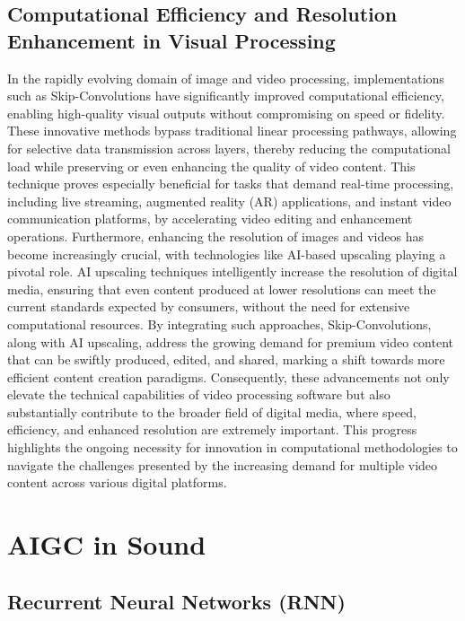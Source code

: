 \documentclass[11pt,a4paper,oneside]{report}
\begin{document}
\subsection{Computational Efficiency and Resolution Enhancement in Visual Processing}

In the rapidly evolving domain of image and video processing, implementations such as Skip-Convolutions \cite{habibian2021skip} have significantly improved computational efficiency, enabling high-quality visual outputs without compromising on speed or fidelity. 
These innovative methods bypass traditional linear processing pathways, allowing for selective data transmission across layers, thereby reducing the computational load while preserving or even enhancing the quality of video content. 
This technique proves especially beneficial for tasks that demand real-time processing, including live streaming, augmented reality (AR) applications, and instant video communication platforms, by accelerating video editing and enhancement operations. 
Furthermore, enhancing the resolution of images and videos has become increasingly crucial, with technologies like AI-based upscaling playing a pivotal role. 
AI upscaling techniques intelligently increase the resolution of digital media, ensuring that even content produced at lower resolutions can meet the current standards expected by consumers, without the need for extensive computational resources. \cite{ignatov2021real}
By integrating such approaches, Skip-Convolutions, along with AI upscaling, address the growing demand for premium video content that can be swiftly produced, edited, and shared, marking a shift towards more efficient content creation paradigms. 
Consequently, these advancements not only elevate the technical capabilities of video processing software but also substantially contribute to the broader field of digital media, where speed, efficiency, and enhanced resolution are extremely important. 
This progress highlights the ongoing necessity for innovation in computational methodologies to navigate the challenges presented by the increasing demand for multiple video content across various digital platforms.


\section{AIGC in Sound}

\subsection{Recurrent Neural Networks (RNN)}
\end{document}
